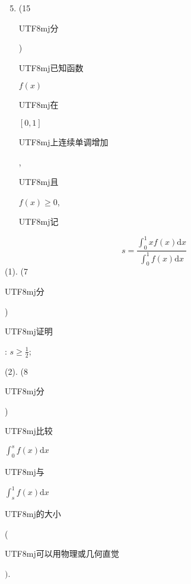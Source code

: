 \documentclass[10pt]{article}
\begin{document}
\begin{enumerate}
  \setcounter{enumi}{4}
  \item (15 \begin{CJK}{UTF8}{mj}分\end{CJK}) \begin{CJK}{UTF8}{mj}已知函数\end{CJK} $f(x)$ \begin{CJK}{UTF8}{mj}在\end{CJK} $[0,1]$ \begin{CJK}{UTF8}{mj}上连续单调增加\end{CJK}, \begin{CJK}{UTF8}{mj}且\end{CJK} $f(x) \geq 0$, \begin{CJK}{UTF8}{mj}记\end{CJK}
\end{enumerate}
$$
s=\frac{\int_{0}^{1} x f(x) \mathrm{d} x}{\int_{0}^{1} f(x) \mathrm{d} x}
$$
(1). (7 \begin{CJK}{UTF8}{mj}分\end{CJK}) \begin{CJK}{UTF8}{mj}证明\end{CJK}: $s \geq \frac{1}{2}$;

(2). (8 \begin{CJK}{UTF8}{mj}分\end{CJK}) \begin{CJK}{UTF8}{mj}比较\end{CJK} $\int_{0}^{s} f(x) \mathrm{d} x$ \begin{CJK}{UTF8}{mj}与\end{CJK} $\int_{s}^{1} f(x) \mathrm{d} x$ \begin{CJK}{UTF8}{mj}的大小\end{CJK} (\begin{CJK}{UTF8}{mj}可以用物理或几何直觉\end{CJK} $)$.
\end{document}
